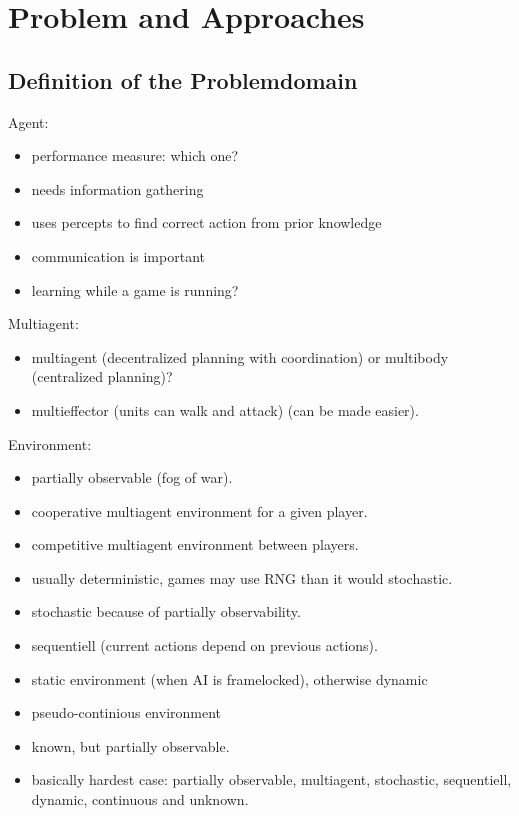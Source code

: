 
\chapter{Problem and Approaches}
\label{ch:ProblemApproaches}

\section{Definition of the Problemdomain}
Agent:
\begin{itemize}[noitemsep,nolistsep]
    \item performance measure: which one?
    \item needs information gathering
    \item uses percepts to find correct action from prior knowledge
    \item communication is important
    \item learning while a game is running?
\end{itemize}
\medskip
Multiagent:
\begin{itemize}[noitemsep,nolistsep]
    \item multiagent (decentralized planning with coordination) or multibody (centralized planning)?
    \item multieffector (units can walk and attack) (can be made easier).
\end{itemize}
\medskip
Environment:
\begin{itemize}[noitemsep,nolistsep]
    \item partially observable (fog of war).
    \item cooperative multiagent environment for a given player.
    \item competitive multiagent environment between players.
    \item usually deterministic, games may use RNG than it would stochastic.
    \item stochastic because of partially observability.
    \item sequentiell  (current actions depend on previous actions).
    \item static environment (when AI is framelocked), otherwise dynamic
    \item pseudo-continious environment
    \item known, but partially observable.
    \item basically hardest case: partially observable, multiagent, stochastic, sequentiell, dynamic, continuous and unknown.
\end{itemize}

